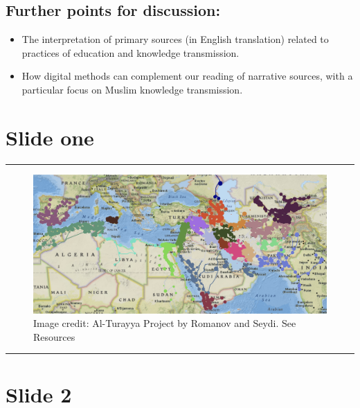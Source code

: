 \documentclass[
]{book}
\providecommand{\tightlist}{%
  \setlength{\itemsep}{0pt}\setlength{\parskip}{0pt}}
\begin{document}
\hypertarget{further-points-for-discussion}{%
\subsection{Further points for discussion:}\label{further-points-for-discussion}}

\begin{itemize}
\tightlist
\item
  The interpretation of primary sources (in English translation) related to practices of education and knowledge transmission.
\item
  How digital methods can complement our reading of narrative sources, with a particular focus on Muslim knowledge transmission.
\end{itemize}

\hypertarget{slide-one}{%
\section{Slide one}\label{slide-one}}

\begin{center}\rule{0.5\linewidth}{0.5pt}\end{center}

\begin{figure}
\centering
\includegraphics{./files/map3.png}
\caption{Image credit: Al-Turayya Project by Romanov and Seydi. See Resources}
\end{figure}

\begin{center}\rule{0.5\linewidth}{0.5pt}\end{center}

\hypertarget{slide-2}{%
\section{Slide 2}\label{slide-2}}
\end{document}
